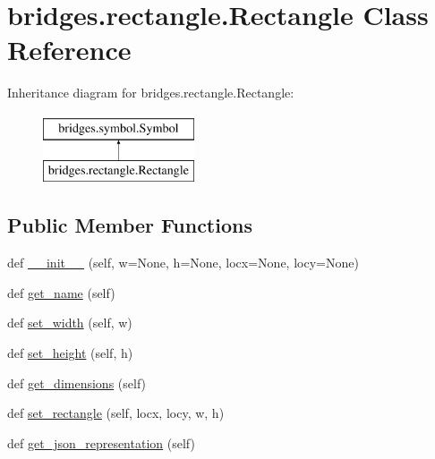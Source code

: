 \hypertarget{classbridges_1_1rectangle_1_1_rectangle}{}\section{bridges.\+rectangle.\+Rectangle Class Reference}
\label{classbridges_1_1rectangle_1_1_rectangle}
Inheritance diagram for bridges.\+rectangle.\+Rectangle\+:\begin{figure}[H]
\begin{center}
\leavevmode
\includegraphics[height=2.000000cm]{classbridges_1_1rectangle_1_1_rectangle}
\end{center}
\end{figure}
\subsection*{Public Member Functions}
\begin{DoxyCompactItemize}
\item 
def \mbox{\hyperlink{classbridges_1_1rectangle_1_1_rectangle_a8cc157b5aaf7ae647cff1c778353c438}{\+\_\+\+\_\+init\+\_\+\+\_\+}} (self, w=None, h=None, locx=None, locy=None)
\item 
def \mbox{\hyperlink{classbridges_1_1rectangle_1_1_rectangle_aad74ee17feb376967249296d34dfcb74}{get\+\_\+name}} (self)
\item 
def \mbox{\hyperlink{classbridges_1_1rectangle_1_1_rectangle_aae3e38041475030ab7a176560b660e20}{set\+\_\+width}} (self, w)
\item 
def \mbox{\hyperlink{classbridges_1_1rectangle_1_1_rectangle_ac03e9d6d12016effa35370fa45cd4269}{set\+\_\+height}} (self, h)
\item 
def \mbox{\hyperlink{classbridges_1_1rectangle_1_1_rectangle_a3f3823c7058ee639a92494276c2c9f22}{get\+\_\+dimensions}} (self)
\item 
def \mbox{\hyperlink{classbridges_1_1rectangle_1_1_rectangle_a187376dcdc5c10c5b1ce5f3f00a80961}{set\+\_\+rectangle}} (self, locx, locy, w, h)
\item 
def \mbox{\hyperlink{classbridges_1_1rectangle_1_1_rectangle_abed807aa2b797312357395f874577a64}{get\+\_\+json\+\_\+representation}} (self)
\end{DoxyCompactItemize}
